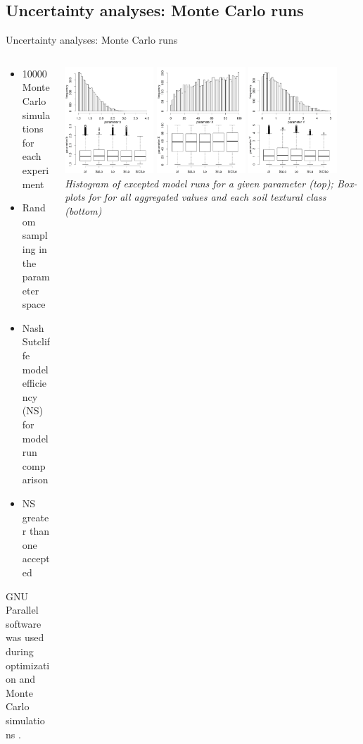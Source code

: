 \subsection{Uncertainty analyses: Monte Carlo runs}
\begin{block}{Uncertainty analyses: Monte Carlo runs}
\begin{columns}
    \begin{column}{0.25\textwidth}
        \begin{itemize}
            \item 10000 Monte Carlo simulations for each experiment
            \item Random sampling in the parameter space
            \item Nash Sutcliffe model efficiency (NS) for model run comparison
            \item NS greater than one accepted
        \end{itemize}
        GNU Parallel software was used during optimization and Monte Carlo simulations \citep{Tange2011a}. 
        \end{column}
        \begin{column}{0.75\textwidth}
            \includegraphics[width = 0.3\textwidth]{obr/mc_b.png}
            \includegraphics[width = 0.3\textwidth]{obr/mc_x.png}
            \includegraphics[width = 0.3\textwidth]{obr/mc_y.png}
            {\it  Histogram of excepted model runs for a given parameter (top); Box-plots for for all aggregated values and each soil textural class (bottom)}
        \end{column}
    \end{columns}
\end{block}















